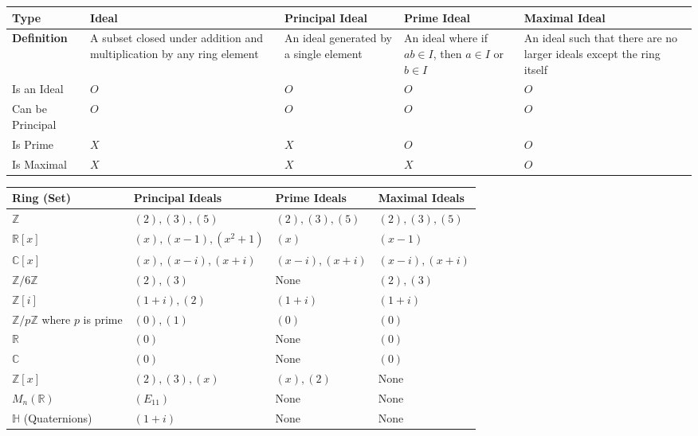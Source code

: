 \documentclass[11pt,openany]{article}
\begin{document}
	\begin{center}
		\begin{tabular}{|>{\centering\arraybackslash}m{4cm}|>{\centering\arraybackslash}m{2cm}|>{\centering\arraybackslash}m{2cm}|>{\centering\arraybackslash}m{2cm}|>{\centering\arraybackslash}m{2cm}|}
			\hline
			\textbf{Type} & \textbf{Ideal} & \textbf{Principal Ideal} & \textbf{Prime Ideal} & \textbf{Maximal Ideal} \\
			\hline
			\textbf{Definition} & A subset closed under addition and multiplication by any ring element & An ideal generated by a single element & An ideal where if \(ab \in I\), then \(a \in I\) or \(b \in I\) & An ideal such that there are no larger ideals except the ring itself \\
			\hline
			Is an Ideal & \(O\) & \(O\) & \(O\) & \(O\) \\
			\hline
			Can be Principal & \(O\) & \(O\) & \(O\) & \(O\) \\
			\hline
			Is Prime & \(X\) & \(X\) & \(O\) & \(O\) \\
			\hline
			Is Maximal & \(X\) & \(X\) & \(X\) & \(O\) \\
			\hline
		\end{tabular}
	\end{center}
	
	\begin{center}
		\begin{tabular}{|>{\centering\arraybackslash}m{4cm}|>{\centering\arraybackslash}m{3cm}|>{\centering\arraybackslash}m{3cm}|>{\centering\arraybackslash}m{3cm}|}
			\hline
			\textbf{Ring (Set)} & \textbf{Principal Ideals} & \textbf{Prime Ideals} & \textbf{Maximal Ideals} \\
			\hline
			\(\mathbb{Z}\) & \((2), (3), (5)\) & \((2), (3), (5)\) & \((2), (3), (5)\) \\
			\hline
			\(\mathbb{R}[x]\) & \((x), (x-1), (x^2+1)\) & \((x)\) & \((x-1)\) \\
			\hline
			\(\mathbb{C}[x]\) & \((x), (x-i), (x+i)\) & \((x-i), (x+i)\) & \((x-i), (x+i)\) \\
			\hline
			\(\mathbb{Z}/6\mathbb{Z}\) & \((2), (3)\) & None & \((2), (3)\) \\
			\hline
			\(\mathbb{Z}[i]\) & \((1+i), (2)\) & \((1+i)\) & \((1+i)\) \\
			\hline
			\(\mathbb{Z}/p\mathbb{Z}\) where \(p\) is prime & \((0), (1)\) & \((0)\) & \((0)\) \\
			\hline
			\(\mathbb{R}\) & \((0)\) & None & \((0)\) \\
			\hline
			\(\mathbb{C}\) & \((0)\) & None & \((0)\) \\
			\hline
			\(\mathbb{Z}[x]\) & \((2), (3), (x)\) & \((x), (2)\) & None \\
			\hline
			\(M_n(\mathbb{R})\) & \((E_{11})\) & None & None \\
			\hline
			\(\mathbb{H}\) (Quaternions) & \((1+i)\) & None & None \\
			\hline
		\end{tabular}
	\end{center}
	
\end{document}
